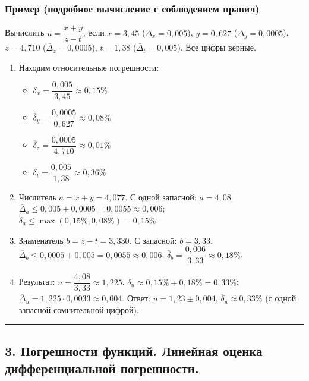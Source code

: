 \documentclass[14pt,a4paper]{extarticle}
\begin{document}
\subsubsection{Пример (подробное вычисление с соблюдением правил)}

Вычислить $u = \dfrac{x + y}{z - t}$, если $x = 3{,}45$ ($\overline{\Delta}_x = 0{,}005$), $y = 0{,}627$ ($\overline{\Delta}_y = 0{,}0005$), $z = 4{,}710$ ($\overline{\Delta}_z = 0{,}0005$), $t = 1{,}38$ ($\overline{\Delta}_t = 0{,}005$). Все цифры верные.

\begin{enumerate}
    \item Находим относительные погрешности:
    \begin{itemize}
        \item $\overline{\delta}_x = \dfrac{0{,}005}{3{,}45} \approx 0{,}15\%$
        \item $\overline{\delta}_y = \dfrac{0{,}0005}{0{,}627} \approx 0{,}08\%$
        \item $\overline{\delta}_z = \dfrac{0{,}0005}{4{,}710} \approx 0{,}01\%$
        \item $\overline{\delta}_t = \dfrac{0{,}005}{1{,}38} \approx 0{,}36\%$
    \end{itemize}
    \item Числитель $a = x + y = 4{,}077$. С одной запасной: $a = 4{,}08$.
    $\overline{\Delta}_a \leq 0{,}005 + 0{,}0005 = 0{,}0055 \approx 0{,}006$; $\overline{\delta}_a \leq \max(0{,}15\%, 0{,}08\%) = 0{,}15\%$.
    \item Знаменатель $b = z - t = 3{,}330$. С запасной: $b = 3{,}33$.
    $\overline{\Delta}_b \leq 0{,}0005 + 0{,}005 = 0{,}0055 \approx 0{,}006$; $\overline{\delta}_b = \dfrac{0{,}006}{3{,}33} \approx 0{,}18\%$.
    \item Результат: $u = \dfrac{4{,}08}{3{,}33} \approx 1{,}225$.
    $\overline{\delta}_u \approx 0{,}15\% + 0{,}18\% = 0{,}33\%$; $\overline{\Delta}_u = 1{,}225 \cdot 0{,}0033 \approx 0{,}004$.
    Ответ: $u = 1{,}23 \pm 0{,}004$, $\overline{\delta}_u \approx 0{,}33\%$ (с одной запасной сомнительной цифрой).
\end{enumerate}

\hrule\bigskip

\subsection{3. Погрешности функций. Линейная оценка дифференциальной погрешности.}
\end{document}

